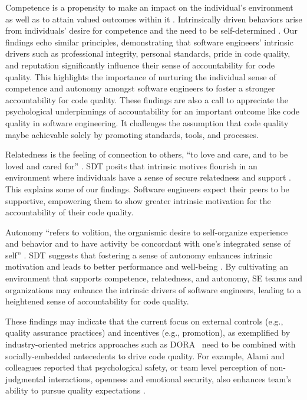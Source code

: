 Competence is a propensity to make an impact on the individual's environment as well as to attain valued outcomes within it \citep{deci2000and}. Intrinsically driven behaviors arise from individuals' desire for competence and the need to be self-determined \citep{deci2000and}. Our findings echo similar principles, demonstrating that software engineers' intrinsic drivers such as professional integrity, personal standards, pride in code quality, and reputation significantly influence their sense of accountability for code quality. This highlights the importance of nurturing the individual sense of competence and autonomy amongst software engineers to foster a stronger accountability for code quality. These findings are also a call to appreciate the psychological underpinnings of accountability for an important outcome like code quality in software engineering. It challenges the assumption that code quality maybe achievable solely by promoting standards, tools, and processes.

Relatedness is the feeling of connection to others, ``to love and care, and to be loved and cared for'' \citep{baum2017optimal,ryan1996supportive}. SDT posits that intrinsic motives flourish in an environment where individuals have a sense of secure relatedness and support \citep{deci2000and}. This explains some of our findings. Software engineers expect their peers to be supportive, empowering them to show greater intrinsic motivation for the accountability of their code quality.

Autonomy ``refers to volition, the organismic desire to self-organize experience and behavior and to have activity be concordant with one's integrated sense of self'' \citep{deci2000and}. SDT suggests that fostering a sense of autonomy enhances intrinsic motivation and leads to better performance and well-being \citep{reeve1998autonomy,deci2000and}. By cultivating an environment that supports competence, relatedness, and autonomy, SE teams and organizations may enhance the intrinsic drivers of software engineers, leading to a heightened sense of accountability for code quality. 

These findings may indicate that the current focus on external controls (e.g., quality assurance practices) and incentives (e.g., promotion), as exemplified by industry-oriented metrics approaches such as DORA~\cite{forsgren2018} need to be combined with socially-embedded antecedents to drive code quality. For example, Alami and colleagues reported that psychological safety, or team level perception of non-judgmental interactions, openness and emotional security, also enhances team's ability to pursue quality expectations \citep{alami2024role}.

